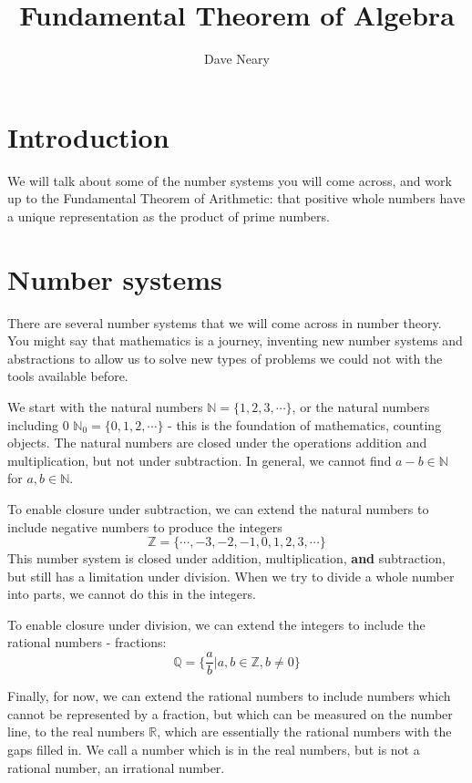 \documentclass{article}
\begin{document}
\author{Dave Neary}
\title{Fundamental Theorem of Algebra}

\maketitle

\section{Introduction}

We will talk about some of the number systems you will come across, and work
up to the Fundamental Theorem of Arithmetic: that positive whole numbers have
a unique representation as the product of prime numbers.

\section{Number systems}

There are several number systems that we will come across in number theory.
You might say that mathematics is a journey, inventing new number systems
and abstractions to allow us to solve new types of problems we could not
with the tools available before.

We start with the natural numbers $\mathbb{N} = \{1,2,3,\cdots\}$, or the
natural numbers including 0 $\mathbb{N}_0 = \{0,1,2,\cdots\}$ - this
is the foundation of mathematics, counting objects. The natural numbers are
closed under the operations addition and multiplication, but not under
subtraction. In general, we cannot find $a-b \in \mathbb{N}$ for $a,b \in
\mathbb{N}$.

To enable closure under subtraction, we can extend the natural numbers to
include negative numbers to produce the integers
\[\mathbb{Z} = \{\cdots,-3,-2,-1,0,1,2,3,\cdots\}\] This number system is
closed under addition, multiplication, \textbf{and} subtraction, but still
has a limitation under division. When we try to divide a whole number into
parts, we cannot do this in the integers.

To enable closure under division, we can extend the integers to include the
rational numbers - fractions: \[\mathbb{Q} = \{\frac{a}{b} | a,b\in \mathbb{Z},
b \neq 0 \}\]

Finally, for now, we can extend the rational numbers to include numbers which
cannot be represented by a fraction, but which can be measured on the number
line, to the real numbers $\mathbb{R}$, which are essentially the rational
numbers with the gaps filled in. We call a number which is in the real numbers,
but is not a rational number, an irrational number.
\end{document}
